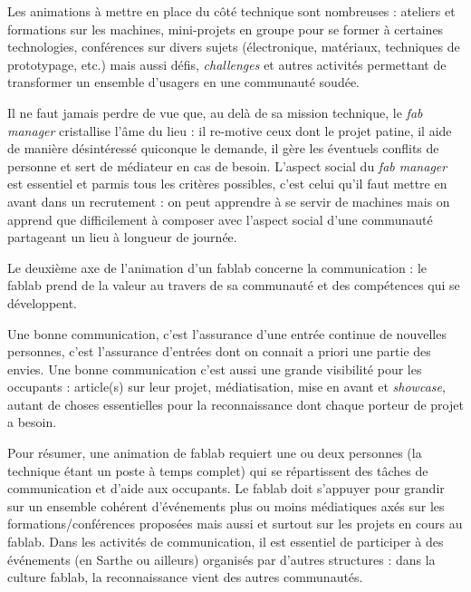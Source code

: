 \documentclass[a4paper,10pt]{scrartcl}
\begin{document}
Les animations à mettre en place du côté technique sont nombreuses : ateliers et formations sur les machines, mini-projets en groupe pour se former à certaines technologies, conférences sur divers sujets (électronique, matériaux, techniques de prototypage, etc.) mais aussi défis, \textit{challenges} et autres activités permettant de transformer un ensemble d'usagers en une communauté soudée.

Il ne faut jamais perdre de vue que, au delà de sa mission technique, le \textit{fab manager} cristallise l'âme du lieu : il re-motive ceux dont le projet patine, il aide de manière désintéressé quiconque le demande, il gère les éventuels conflits de personne et sert de médiateur en cas de besoin. L'aspect social du \textit{fab manager} est essentiel et parmis tous les critères possibles, c'est celui qu'il faut mettre en avant dans un recrutement : on peut apprendre à se servir de machines mais on apprend que difficilement à composer avec l'aspect social d'une communauté partageant un lieu à longueur de journée.

Le deuxième axe de l'animation d'un fablab concerne la communication : le fablab prend de la valeur au travers de sa communauté et des compétences qui se développent.

Une bonne communication, c'est l'assurance d'une entrée continue de nouvelles personnes, c'est l'assurance d'entrées dont on connait a priori une partie des envies. Une bonne communication c'est aussi une grande visibilité pour les occupants : article(s) sur leur projet, médiatisation, mise en avant et \textit{showcase}, autant de choses essentielles pour la reconnaissance dont chaque porteur de projet a besoin.

Pour résumer, une animation de fablab requiert une ou deux personnes (la technique étant un poste à temps complet) qui se répartissent des tâches de communication et d'aide aux occupants. Le fablab doit s'appuyer pour grandir sur un ensemble cohérent d’événements plus ou moins médiatiques axés sur les formations/conférences proposées mais aussi et surtout sur les projets en cours au fablab. Dans les activités de communication, il est essentiel de participer à des événements (en Sarthe ou ailleurs) organisés par d'autres structures : dans la culture fablab, la reconnaissance vient des autres communautés.
\end{document}
